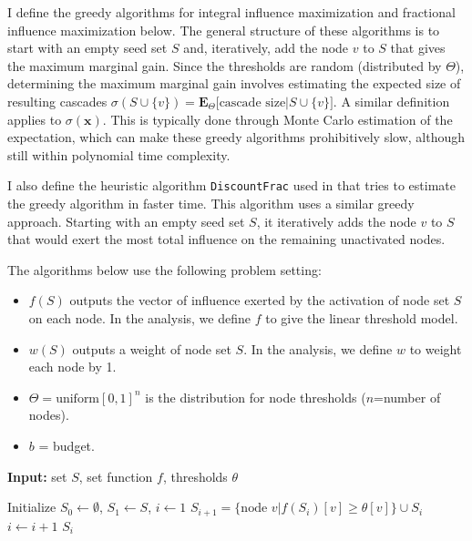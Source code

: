 \documentclass[11pt]{article}
\renewcommand{\algorithmicrequire}{\textbf{Input:}}  %
\begin{document}
I define the greedy algorithms for integral influence maximization and fractional influence maximization below. The general structure of these algorithms is to start with an empty seed set $S$ and, iteratively, add the node $v$ to $S$ that gives the maximum marginal gain. Since the thresholds are random (distributed by $\Theta$), determining the maximum marginal gain involves estimating the expected size of resulting cascades $\sigma(S\cup\{v\}) = \mathbf{E}_\Theta \Big[\text{cascade size} | S\cup\{v\}\Big]$. A similar definition applies to $\sigma(\mathbf x)$. This is typically done through Monte Carlo estimation of the expectation, which can make these greedy algorithms prohibitively slow, although still within polynomial time complexity.

I also define the heuristic algorithm \texttt{DiscountFrac} used in \cite{demaine14} that tries to estimate the greedy algorithm in faster time. This algorithm uses a similar greedy approach. Starting with an empty seed set $S$, it iteratively adds the node $v$ to $S$ that would exert the most total influence on the remaining unactivated nodes.

The algorithms below use the following problem setting:
\begin{itemize}
	\item $f(S)$ outputs the vector of influence exerted by the activation of node set $S$ on each node. In the analysis, we define $f$ to give the linear threshold model.
	\item $w(S)$ outputs a weight of node set $S$.  In the analysis, we define $w$ to weight each node by 1.
	\item $\Theta = \text{uniform}[0,1]^n$ is the distribution for node thresholds ($n$=number of nodes).
	\item $b$ = budget.
\end{itemize}


\begin{algorithm}[H]
	\algorithmicrequire { set $S$, set function $f$, thresholds $\theta$}
	\begin{algorithmic}
		\State Initialize $S_0 \leftarrow \emptyset$, $S_1 \leftarrow S$, $i \leftarrow 1$
		\State $S_{i+1} = \{\text{node } v | f(S_i)[v] \geq \theta[v]\}\cup S_i$
		\State $i \leftarrow i+1$
		\EndWhile
		\State \Return $S_i$
	\end{algorithmic}
	\caption{$\texttt{CalcIntCascade}(S;f,\theta)$} \label{alg:calc_int_cascade}
\end{algorithm}
\end{document}
